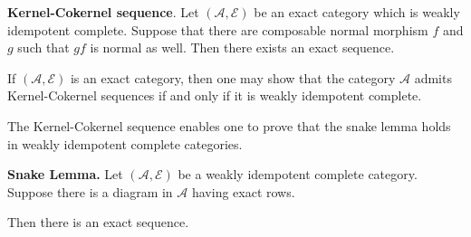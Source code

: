     \begin{lemma}
        \textbf{Kernel-Cokernel sequence}.
        Let $(\mathcal{A},\mathcal{E})$ be an exact category which is weakly idempotent complete. Suppose that there are composable normal morphism $f$ and $g$ such that $gf$ is normal as well. Then there exists an exact sequence.
        \begin{center}
        \end{center} 
    \end{lemma}


    \begin{remark}
        If $(\mathcal{A},\mathcal{E})$ is an exact category, then one may show that the category $\mathcal{A}$ admits Kernel-Cokernel sequences if and only if it is weakly idempotent complete.
    \end{remark}

    The Kernel-Cokernel sequence enables one to prove that the snake lemma holds in weakly idempotent complete categories.

    \begin{corollary}
        \textbf{Snake Lemma.}
        Let $(\mathcal{A},\mathcal{E})$ be a weakly idempotent complete category. Suppose there is a diagram in $\mathcal{A}$ having exact rows.
        \begin{center}
        \end{center}

        Then there is an exact sequence.
        \begin{center}
        \end{center}
    \end{corollary}

